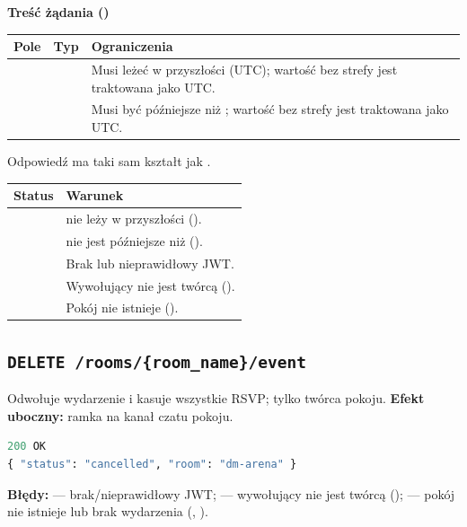 \textbf{Treść żądania ()}

\begin{tabularx}{\textwidth}{llY}
\toprule
Pole & Typ & Ograniczenia \\
\midrule
{} &  & Musi leżeć w przyszłości (UTC); wartość bez strefy jest traktowana jako UTC. \\
 &  & Musi być późniejsze niż ; wartość bez strefy jest traktowana jako UTC. \\
\bottomrule
\end{tabularx}

Odpowiedź  ma taki sam kształt jak .

\begin{tabularx}{\textwidth}{lY}
\toprule
Status & Warunek \\
\midrule
{} &  nie leży w przyszłości (). \\
 &  nie jest późniejsze niż  (). \\
 & Brak lub nieprawidłowy JWT. \\
 & Wywołujący nie jest twórcą (). \\
 & Pokój nie istnieje (). \\
\bottomrule
\end{tabularx}

\subsection{\texttt{DELETE /rooms/\{room\_name\}/event}}

Odwołuje wydarzenie i kasuje wszystkie RSVP; tylko twórca pokoju. \textbf{Efekt uboczny:} ramka
 na kanał czatu pokoju.

\begin{lstlisting}[language=Python]
200 OK
{ "status": "cancelled", "room": "dm-arena" }
\end{lstlisting}

\textbf{Błędy:}  --- brak/nieprawidłowy JWT;  --- wywołujący nie jest twórcą
();  --- pokój nie istnieje lub brak
wydarzenia (, ).

